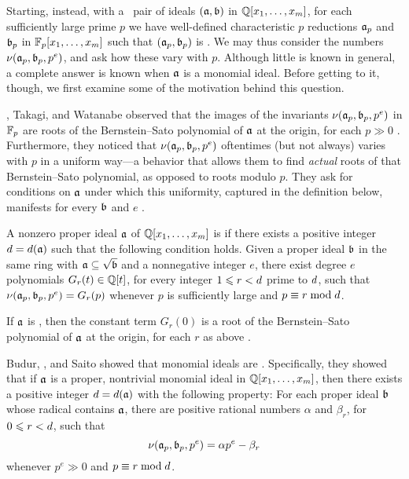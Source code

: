 \documentclass{article}
\begin{document}
Starting, instead, with a \compatible\ pair of ideals $(\mathfrak{a},\mathfrak{b})$ in $\mathbb{Q}[x_1,\ldots,x_m]$, for each sufficiently large prime $p$ we have well-defined characteristic $p$ reductions $\mathfrak{a}_p$ and $\mathfrak{b}_p$ in $\mathbb{F}_p[x_1,\ldots,x_m]$ such that $(\mathfrak{a}_p,\mathfrak{b}_p)$ is \compatible.
We may thus consider the numbers $\nu(\mathfrak{a}_p,\mathfrak{b}_p,p^e)$, and ask how these vary with $p$.
Although little is known in general, a complete answer is known when $\mathfrak{a}$ is a monomial ideal.
Before getting to it, though, we first examine some of the motivation behind this question.

\mustata, Takagi, and Watanabe observed that the images of the invariants $\nu(\mathfrak{a}_p,\mathfrak{b}_p,p^e)$ in $\mathbb{F}_p$ are roots of the Bernstein--Sato polynomial of $\mathfrak{a}$ at the origin, for each $p \gg 0$ \cite[Proposition~3.11]{mustata+takagi+watanabe.F-thresholds}.
Furthermore, they noticed that $\nu(\mathfrak{a}_p,\mathfrak{b}_p,p^e)$ oftentimes (but not always) varies with $p$ in a uniform way---a behavior that allows them to find \emph{actual} roots of that Bernstein--Sato polynomial, as opposed to roots modulo $p$.
They ask for conditions on $\mathfrak{a}$ under which this uniformity, captured in the definition below, manifests for every $\mathfrak{b}$ and $e$ \cite[Problem~3.8]{mustata+takagi+watanabe.F-thresholds}.

\begin{definition}
   \label{defn: nuCool}
   A nonzero proper ideal $\mathfrak{a}$ of $\mathbb{Q}[x_1,\ldots,x_m]$ is \emph{\nuCool} if there exists a positive integer $d = d(\mathfrak{a})$ such that the following condition holds.
   Given a proper ideal $\mathfrak{b}$ in the same ring with $\mathfrak{a} \subseteq \sqrt {\mathfrak{b}}$ and a nonnegative integer $e$, there exist degree $e$ polynomials $G_r(t) \in \mathbb{Q}[t]$, for every integer $1 \leqslant r < d$ prime to $d$, such that $\nu(\mathfrak{a}_p, \mathfrak{b}_p, p^e) = G_r(p)$ whenever $p$ is sufficiently large and $p \equiv r \bmod d$.
\end{definition}

If $\mathfrak{a}$ is \nuCool, then the constant term $G_r(0)$ is a root of the Bernstein--Sato polynomial of $\mathfrak{a}$ at the origin, for each $r$ as above \cite[Remark~3.13]{mustata+takagi+watanabe.F-thresholds}.

\smallskip

Budur, \mustata, and Saito showed that monomial ideals are \nuCool \cite[Theorem~4.1]{budur+mustata+saito.roots_bs_polys_monomial}.
Specifically, they showed that if $\mathfrak{a}$ is a proper, nontrivial monomial ideal in $\mathbb{Q}[x_1,\ldots,x_m]$, then there exists a positive integer $d = d(\mathfrak{a})$ with the following property:
For each proper ideal $\mathfrak{b}$ whose radical contains $\mathfrak{a}$, there are positive rational numbers $\alpha$ and $\beta_r$, for $0 \leqslant r < d$, such that
\begin{equation}
   \label{eq: nu-uniformity for monomial ideals}
   \nu(\mathfrak{a}_p, \mathfrak{b}_p, p^e) = \alpha p^e - \beta_r
\end{equation}
whenever $p^e \gg 0$ and $p \equiv r \bmod d$.
\end{document}
